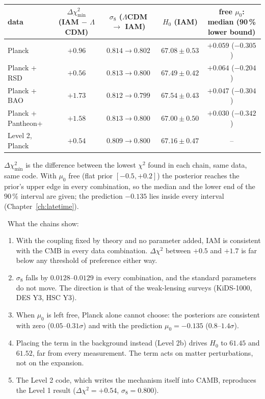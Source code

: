 \begin{center}
\small
\begin{tabular}{lcccc}
\toprule
data & $\Delta\chi^2_{\min}$ (IAM $-$ $\Lambda$CDM) & $\sigma_8$ ($\Lambda$CDM $\to$ IAM) & $H_0$ (IAM) & free $\mu_0$: median (90\,\% lower bound) \\
\midrule
Planck            & $+0.96$ & $0.814\to0.802$ & $67.08\pm0.53$ & $+0.059$ ($-0.305$) \\
Planck + RSD      & $+0.56$ & $0.813\to0.800$ & $67.49\pm0.42$ & $+0.064$ ($-0.204$) \\
Planck + BAO      & $+1.73$ & $0.812\to0.799$ & $67.54\pm0.43$ & $+0.047$ ($-0.304$) \\
Planck + Pantheon+ & $+1.58$ & $0.813\to0.800$ & $67.00\pm0.50$ & $+0.030$ ($-0.342$) \\
\midrule
Level 2, Planck   & $+0.54$ & $0.809\to0.800$ & $67.16\pm0.47$ & -- \\
\bottomrule
\end{tabular}
\end{center}
$\Delta\chi^2_{\min}$ is the difference between the lowest $\chi^2$ found in each chain, same data, same code. With $\mu_0$ free (flat prior $[-0.5,+0.2]$) the posterior reaches the prior's upper edge in every combination, so the median and the lower end of the $90\,\%$ interval are given; the prediction $-0.135$ lies inside every interval (Chapter~\ref{ch:latetime}).

\observed\ What the chains show:
\begin{enumerate}
 \item With the coupling fixed by theory and no parameter added, IAM is consistent with the CMB in every data combination.
       $\Delta\chi^2$ between $+0.5$ and $+1.7$ is far below any threshold of preference either way.
 \item $\sigma_8$ falls by $0.0128$--$0.0129$ in every combination, and the standard parameters do not move.
       The direction is that of the weak-lensing surveys (KiDS-1000, DES Y3, HSC Y3).
 \item When $\mu_0$ is left free, Planck alone cannot choose: the posteriors are consistent with zero ($0.05$--$0.31\sigma$)
       and with the prediction $\mu_0=-0.135$ ($0.8$--$1.4\sigma$).
 \item Placing the term in the background instead (Level 2b) drives $H_0$ to $61.45$ and $61.52$, far from every measurement.
       The term acts on matter perturbations, not on the expansion.
 \item The Level 2 code, which writes the mechanism itself into CAMB, reproduces the Level 1 result ($\Delta\chi^2=+0.54$, $\sigma_8=0.800$).
\end{enumerate}

